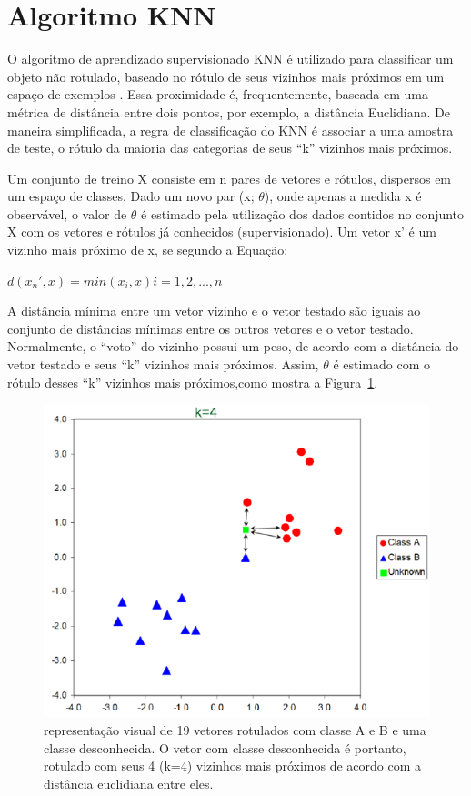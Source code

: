 \documentclass[12pt]{article}
\begin{document}
\section{Algoritmo KNN}

O algoritmo de aprendizado supervisionado KNN é utilizado para classificar um
objeto não rotulado, baseado no rótulo de seus vizinhos mais próximos em um
espaço de exemplos \cite{Andersson:2014}. Essa proximidade é, frequentemente,
baseada em uma métrica de distância entre dois pontos, por  exemplo, a
distância Euclidiana. De maneira simplificada, a regra de classificação do KNN
é associar a uma amostra de teste, o rótulo da maioria das categorias de seus
``k'' vizinhos mais próximos.

Um conjunto de treino X consiste em n pares de vetores e rótulos, dispersos em
um espaço de classes. Dado um novo par (x; $\theta$), onde apenas a medida x é
observável, o valor de $\theta$	é estimado pela utilização dos dados contidos
no conjunto X com os vetores e rótulos já conhecidos (supervisionado). Um vetor
x' é um vizinho mais próximo de x, se segundo a Equação:

$d(x_{n}', x) = min(x_i, x) i = 1, 2, ...,n$

A distância mínima entre um vetor vizinho e o vetor testado são iguais ao 
conjunto de distâncias mínimas entre os outros vetores e o vetor testado. 
Normalmente, o ``voto'' do vizinho possui um peso, de acordo com a distância do
vetor testado e seus ``k'' vizinhos mais próximos. Assim, $\theta$ é estimado 
com o rótulo desses ``k'' vizinhos mais próximos,como mostra a 
Figura~\ref{fig:fig1}.

\begin{figure}[!ht]
	\centering
	\includegraphics[scale=0.36]{img/knn.png}
	\caption{representação visual de 19 vetores rotulados com classe A e B e uma
	classe desconhecida. O vetor com classe desconhecida é portanto, rotulado
	com seus 4 (k=4) vizinhos mais próximos de acordo com a distância euclidiana
	entre eles.}
	\label{fig:fig1}
\end{figure}
\end{document}
